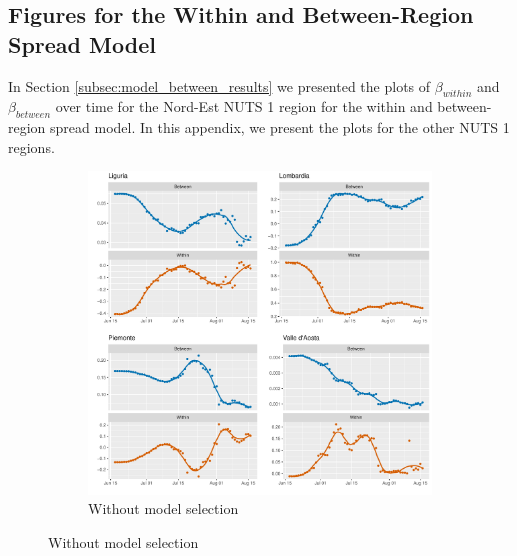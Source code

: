 \documentclass[12pt]{article}
\begin{document}
\begin{appendices}
		\subsection{Figures for the Within and Between-Region Spread Model} \label{sapp:model_between_figures}
		In Section \ref{subsec:model_between_results} we presented the plots of $\beta_{within}$ and $\beta_{between}$ over time for the Nord-Est NUTS 1 region for the within and between-region spread model. In this appendix, we present the plots for the other NUTS 1 regions.
		
		\begin{figure}[H]
    	    \centering
    	    \begin{subfigure}{\textwidth}
    	      \centering
    	      \includegraphics[width=\linewidth]{output/model_between_lag14_betas_Nord-Ovest_rolling.pdf}
    	      \caption{Without model selection}
    	      \label{fig:beta_between_over_time_nordovest_regular}
    	    \end{subfigure}
        \end{figure}
        \begin{figure}[H]\ContinuedFloat
    	    \begin{subfigure}{\textwidth}
    	      \centering

\end{subfigure}
\end{figure}
\end{appendices}
\end{document}

